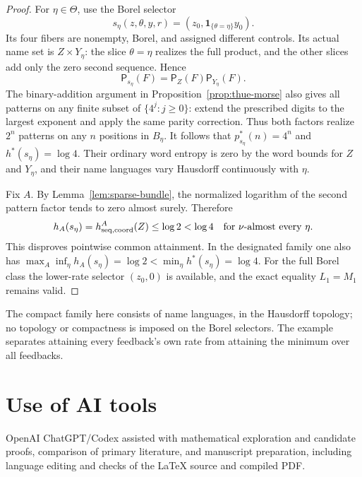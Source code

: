 \documentclass[11pt,reqno]{amsart}
\numberwithin{equation}{section}
\theoremstyle{definition}
\theoremstyle{definition}
\newcommand{\Patt}{\mathsf P}
\newcommand{\one}{\mathbf 1}
\begin{document}
\begin{proof}
For $\eta\in\Theta$, use the Borel selector
\[
 s_\eta(z,\theta,y,r)=(z_0,\one_{\{\theta=\eta\}}y_0).
\]
Its four fibers are nonempty, Borel, and assigned different
controls. Its actual name set is $Z\times Y_\eta$:
the slice $\theta=\eta$ realizes the full product, and the
other slices add only the zero second sequence. Hence
\[
 \Patt_{s_\eta}(F)=\Patt_Z(F)\Patt_{Y_\eta}(F).
\]
The binary-addition argument in Proposition~\ref{prop:thue-morse}
also gives all patterns on any finite subset of
$\{4^j:j\ge0\}$: extend the prescribed digits to the largest
exponent and apply the same parity correction. Thus both factors
realize $2^n$ patterns on any $n$ positions in $B_\eta$.
It follows that $p_{s_\eta}^*(n)=4^n$ and $h^*(s_\eta)=\log4$.
Their ordinary word entropy is zero by the word bounds for
$Z$ and $Y_\eta$, and their name languages vary Hausdorff
continuously with $\eta$.

Fix $A$. By Lemma~\ref{lem:sparse-bundle}, the normalized
logarithm of the second pattern factor tends to zero almost
surely. Therefore
\[
 h_A(s_\eta)=h_{\rm seq,coord}^A(Z)\le\log2<\log4
 \quad\text{for }\nu\text{-almost every }\eta.
\]
This disproves pointwise common attainment. In the designated
family one also has
$\max_A\inf_\eta h_A(s_\eta)=\log2<\min_\eta h^*(s_\eta)=\log4$.
For the full Borel class the lower-rate selector $(z_0,0)$
is available, and the exact equality $L_1=M_1$ remains valid.
\end{proof}

The compact family here consists of name languages, in the Hausdorff
topology; no topology or compactness is imposed on the Borel selectors.
The example separates attaining every feedback's own rate from
attaining the minimum over all feedbacks.


\section*{Use of AI tools}
OpenAI ChatGPT/Codex assisted with mathematical exploration and
candidate proofs, comparison of primary literature, and manuscript
preparation, including language editing and checks of the LaTeX
source and compiled PDF.
\end{document}
